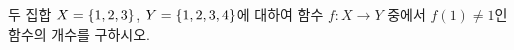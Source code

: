 두 집합 $X=\{1{,}\mkern3mu\mathopen{}2{,}\mkern3mu\mathopen{}3\}$, $Y=\{1{,}\mkern3mu\mathopen{}2{,}\mkern3mu\mathopen{}3{,}\mkern3mu\mathopen{}4\}$에 대하여 함수 $f:X\longrightarrow Y$ 중에서 $f(1)\ne 1$인 함수의 개수를 \mbox{구하시오.}
